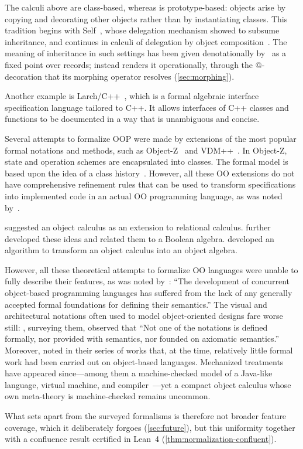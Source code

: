 The calculi above are class-based, whereas \phic{} is prototype-based:
  objects arise by copying and decorating other objects rather
  than by instantiating classes.
This tradition begins with Self~\citep{ungar1987self},
  whose delegation mechanism \citet{stein1987delegation} showed to subsume
  inheritance, and continues in calculi of delegation
  by object composition~\citep{bettinibono2008delegation}.
The meaning of inheritance in such settings has been given
  denotationally by~\citet{cook1989denotational} as a fixed point over records;
  \phic{} instead renders it operationally, through the $@$-decoration that
  its morphing operator resolves (\cref{sec:morphing}).

Another example is Larch/C++~\citep{cheon1994quick},
  which is a formal algebraic interface specification language tailored to C++.
It allows interfaces of C++ classes and functions to be documented
  in a way that is unambiguous and concise.

Several attempts to formalize OOP were made by extensions of
  the most popular formal notations and methods,
  such as Object-Z~\citep{duke1991object} and VDM++~\citep{durr1992vdm}.
In Object-Z, state and operation schemes are encapsulated into classes.
The formal model is based upon the idea
  of a class history~\citep{duke1990towards}.
However, all these OO extensions do not have comprehensive refinement
  rules that can be used to transform specifications into implemented code
  in an actual OO programming language, as was noted by~\citet{paige1999object}.

\citet{bancilhon1985calculus} suggested an object calculus
  as an extension to relational calculus.
\citet{jankowska2003anotheroop} further developed these ideas and related
  them to a Boolean algebra.
\citet{leekwakryu1996transform} developed an algorithm to transform
  an object calculus into an object algebra.

However, all these theoretical attempts to formalize OO languages were unable
  to fully describe their features,
  as was noted by~\citet{nierstrasz1991towards}: ``The development of
  concurrent object-based programming languages has suffered from
  the lack of any generally accepted formal foundations
  for defining their semantics.''
The visual and architectural notations often used to model
  object-oriented designs fare worse still:
  \citet{eden2002visual}, surveying them, observed that
  ``Not one of the notations is defined formally,
  nor provided with  semantics,
  nor founded on axiomatic semantics.''
Moreover, \citet{ciaffaglione2003reasoning,ciaffaglione2003typetheories,ciaffaglione2007theory_of_contexts}
  noted in their series of works that, at the time,
  relatively little formal work had been carried out on object-based languages.
Mechanized treatments have appeared since---among them
  a machine-checked model of a Java-like language,
  virtual machine, and compiler~\citep{klein2006jinja}---yet a compact
  object calculus whose own meta-theory is machine-checked remains uncommon.

What sets \phic{} apart from the surveyed formalisms is therefore
  not broader feature coverage, which it deliberately forgoes
  (\cref{sec:future}), but this uniformity together with
  a confluence result certified in Lean~4 (\cref{thm:normalization-confluent}).
